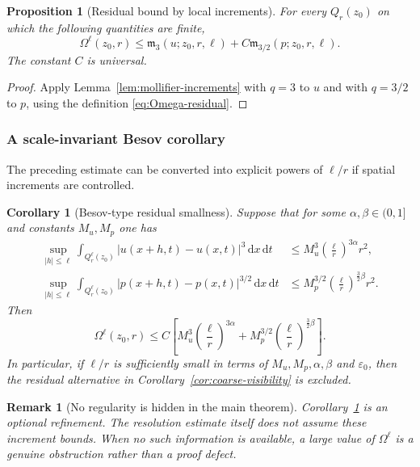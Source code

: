 \documentclass[10pt,a4paper]{amsart}
\numberwithin{equation}{section}
\newtheorem{proposition}[theorem]{Proposition}
\newtheorem{corollary}[theorem]{Corollary}
\newtheorem{remark}[theorem]{Remark}
\newcommand{\eps}{\varepsilon}
\newcommand{\dxdt}{\,\mathrm dx\,\mathrm dt}
\begin{document}
\begin{proposition}[Residual bound by local increments]\label{prop:residual-increments}
For every $Q_r(z_0)$ on which the following quantities are finite,
\begin{equation}\label{eq:Omega-increment-bound}
\Omega^\ell(z_0,r)
\le
\mathfrak m_3(u;z_0,r,\ell)+C\mathfrak m_{3/2}(p;z_0,r,\ell).
\end{equation}
The constant $C$ is universal.
\end{proposition}

\begin{proof}
Apply Lemma~\ref{lem:mollifier-increments} with $q=3$ to $u$ and with $q=3/2$ to $p$, using the definition \eqref{eq:Omega-residual}.
\end{proof}

\subsubsection{A scale-invariant Besov corollary}

The preceding estimate can be converted into explicit powers of $\ell/r$ if spatial increments are controlled.

\begin{corollary}[Besov-type residual smallness]\label{cor:besov-residual}
Suppose that for some $\alpha,\beta\in(0,1]$ and constants $M_u,M_p$ one has
\begin{align}
\sup_{|h|\le\ell}\int_{Q_r^\ell(z_0)}|u(x+h,t)-u(x,t)|^3\dxdt
&\le M_u^3\left(\frac{\ell}{r}\right)^{3\alpha}r^2,
\label{eq:u-besov-assumption}\\
\sup_{|h|\le\ell}\int_{Q_r^\ell(z_0)}|p(x+h,t)-p(x,t)|^{3/2}\dxdt
&\le M_p^{3/2}\left(\frac{\ell}{r}\right)^{\frac32\beta}r^2.
\label{eq:p-besov-assumption}
\end{align}
Then
\begin{equation}\label{eq:besov-Omega-bound}
\Omega^\ell(z_0,r)
\le
C\left[M_u^3\left(\frac{\ell}{r}\right)^{3\alpha}
+M_p^{3/2}\left(\frac{\ell}{r}\right)^{\frac32\beta}\right].
\end{equation}
In particular, if $\ell/r$ is sufficiently small in terms of $M_u,M_p,\alpha,\beta$ and $\eps_0$, then the residual alternative in Corollary~\ref{cor:coarse-visibility} is excluded.
\end{corollary}

\begin{remark}[No regularity is hidden in the main theorem]
Corollary~\ref{cor:besov-residual} is an optional refinement.  The resolution estimate itself does not assume these increment bounds.  When no such information is available, a large value of $\Omega^\ell$ is a genuine obstruction rather than a proof defect.
\end{remark}
\end{document}

